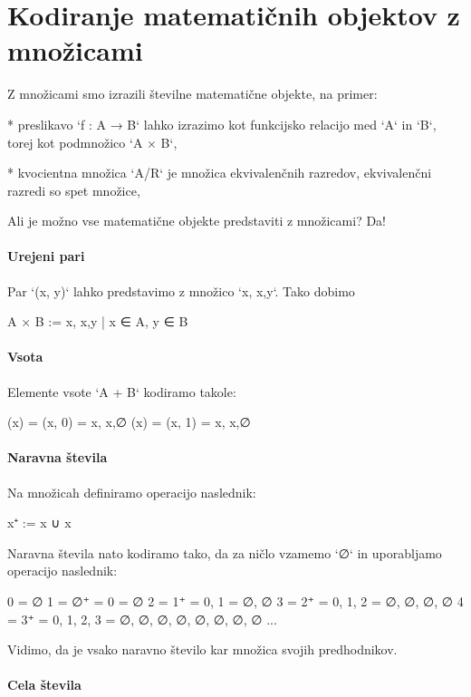 \chapter{Kodiranje matematičnih objektov z množicami}

Z množicami smo izrazili številne matematične objekte, na primer:

* preslikavo `f : A → B` lahko izrazimo kot funkcijsko relacijo med `A` in `B`, torej kot
  podmnožico `A × B`,

* kvocientna množica `A/R` je množica ekvivalenčnih razredov, ekvivalenčni razredi so spet
  množice,

Ali je možno vse matematične objekte predstaviti z množicami? Da!

\subsubsection{Urejeni pari}

Par `(x, y)` lahko predstavimo z množico `{{x}, {x,y}}`. Tako dobimo

    A × B := { {{x}, {x,y}} | x ∈ A, y ∈ B }

\subsubsection{Vsota}

Elemente vsote `A + B` kodiramo takole:

     \inl(x) = (x, 0) = {{x}, {x,∅}}
     \inr(x) = (x, 1) = {{x}, {x,{∅}}}

\subsubsection{Naravna števila}

Na množicah definiramo operacijo naslednik:

    x⁺ := x ∪ {x}

Naravna števila nato kodiramo tako, da za ničlo vzamemo `∅` in uporabljamo
operacijo naslednik:

    0 = ∅
    1 = ∅⁺ = {0} = {∅}
    2 = 1⁺ = {0, 1} = {∅, {∅}}
    3 = 2⁺ = {0, 1, 2} = {∅, {∅}, {∅, {∅}}}
    4 = 3⁺ = {0, 1, 2, 3} = {∅, {∅}, {∅, {∅}}, {∅, {∅}, {∅, {∅}}}}
    ...

Vidimo, da je vsako naravno število kar množica svojih predhodnikov.

\subsubsection{Cela števila}

